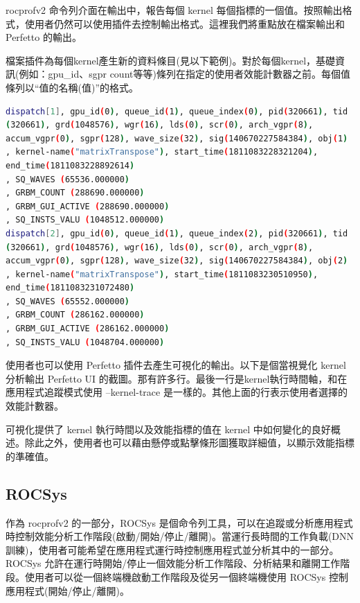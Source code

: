 rocprofv2 命令列介面在輸出中，報告每個 kernel 每個指標的一個值。按照輸出格式，使用者仍然可以使用插件去控制輸出格式。這裡我們將重點放在檔案輸出和 Perfetto 的輸出。

檔案插件為每個kernel產生新的資料條目(見以下範例)。對於每個kernel，基礎資訊(例如：gpu\_id、sgpr count等等)條列在指定的使用者效能計數器之前。每個值條列以“值的名稱(值)”的格式。

\begin{lstlisting}[language=bash, caption={rocprofv2kernel分析功能的輸出檔}, label={lst:Output of kernel profiling feature of rocprofv2}]
dispatch[1], gpu_id(0), queue_id(1), queue_index(0), pid(320661), tid
(320661), grd(1048576), wgr(16), lds(0), scr(0), arch_vgpr(8),
accum_vgpr(0), sgpr(128), wave_size(32), sig(140670227584384), obj(1)
, kernel-name("matrixTranspose"), start_time(1811083228321204),
end_time(1811083228892614)
, SQ_WAVES (65536.000000)
, GRBM_COUNT (288690.000000)
, GRBM_GUI_ACTIVE (288690.000000)
, SQ_INSTS_VALU (1048512.000000)
dispatch[2], gpu_id(0), queue_id(1), queue_index(2), pid(320661), tid
(320661), grd(1048576), wgr(16), lds(0), scr(0), arch_vgpr(8),
accum_vgpr(0), sgpr(128), wave_size(32), sig(140670227584384), obj(2)
, kernel-name("matrixTranspose"), start_time(1811083230510950),
end_time(1811083231072480)
, SQ_WAVES (65552.000000)
, GRBM_COUNT (286162.000000)
, GRBM_GUI_ACTIVE (286162.000000)
, SQ_INSTS_VALU (1048704.000000)
\end{lstlisting}

使用者也可以使用 Perfetto 插件去產生可視化的輸出。以下是個當視覺化 kernel 分析輸出 Perfetto UI 的截圖。那有許多行。最後一行是kernel執行時間軸，和在應用程式追蹤模式使用 –kernel-trace 是一樣的。其他上面的行表示使用者選擇的效能計數器。

可視化提供了 kernel 執行時間以及效能指標的值在 kernel 中如何變化的良好概述。除此之外，使用者也可以藉由懸停或點擊條形圖獲取詳細值，以顯示效能指標的準確值。

\subsection{ROCSys}

作為 rocprofv2 的一部分，ROCSys 是個命令列工具，可以在追蹤或分析應用程式時控制效能分析工作階段(啟動/開始/停止/離開)。當運行長時間的工作負載(DNN 訓練)，使用者可能希望在應用程式運行時控制應用程式並分析其中的一部分。ROCSys 允許在運行時開始/停止一個效能分析工作階段、分析結果和離開工作階段。使用者可以從一個終端機啟動工作階段及從另一個終端機使用 ROCSys 控制應用程式(開始/停止/離開)。

